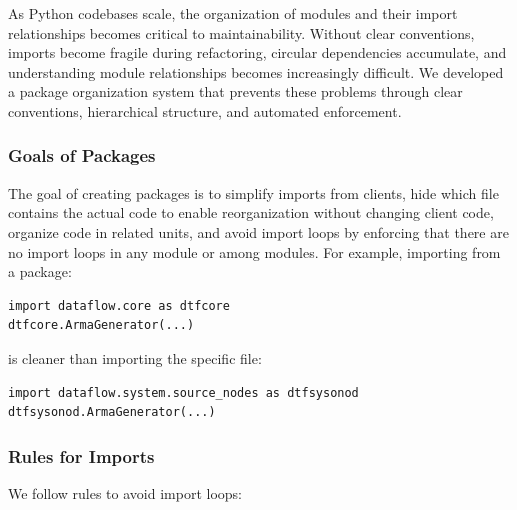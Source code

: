 As Python codebases scale, the organization of modules and their import
relationships becomes critical to maintainability. Without clear conventions,
imports become fragile during refactoring, circular dependencies accumulate,
and understanding module relationships becomes increasingly difficult.
We developed a package organization system that prevents these problems
through clear conventions, hierarchical structure, and automated enforcement.

\subsubsection{Goals of Packages}

The goal of creating packages is to simplify imports from clients,
hide which file contains the actual code to enable reorganization without
changing client code, organize code in related units, and avoid import
loops by enforcing that there are no import loops in any module or
among modules. For example, importing from a package:

\begin{verbatim}
import dataflow.core as dtfcore
dtfcore.ArmaGenerator(...)
\end{verbatim}

is cleaner than importing the specific file:

\begin{verbatim}
import dataflow.system.source_nodes as dtfsysonod
dtfsysonod.ArmaGenerator(...)
\end{verbatim}

\subsubsection{Rules for Imports}

We follow rules to avoid import loops:

